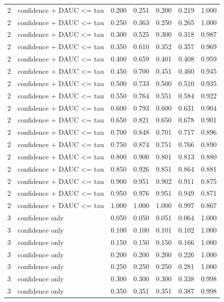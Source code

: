 \begin{tabular}{rlrrrrr}
2 & confidence + DAUC <= tau & 0.200 & 0.251 & 0.200 & 0.219 & 1.000 \\
2 & confidence + DAUC <= tau & 0.250 & 0.363 & 0.250 & 0.265 & 1.000 \\
2 & confidence + DAUC <= tau & 0.300 & 0.525 & 0.300 & 0.318 & 0.987 \\
2 & confidence + DAUC <= tau & 0.350 & 0.610 & 0.352 & 0.357 & 0.969 \\
2 & confidence + DAUC <= tau & 0.400 & 0.659 & 0.401 & 0.408 & 0.959 \\
2 & confidence + DAUC <= tau & 0.450 & 0.700 & 0.451 & 0.460 & 0.945 \\
2 & confidence + DAUC <= tau & 0.500 & 0.733 & 0.500 & 0.510 & 0.935 \\
2 & confidence + DAUC <= tau & 0.550 & 0.764 & 0.551 & 0.584 & 0.922 \\
2 & confidence + DAUC <= tau & 0.600 & 0.793 & 0.600 & 0.631 & 0.904 \\
2 & confidence + DAUC <= tau & 0.650 & 0.821 & 0.650 & 0.678 & 0.901 \\
2 & confidence + DAUC <= tau & 0.700 & 0.848 & 0.701 & 0.717 & 0.896 \\
2 & confidence + DAUC <= tau & 0.750 & 0.874 & 0.751 & 0.766 & 0.890 \\
2 & confidence + DAUC <= tau & 0.800 & 0.900 & 0.801 & 0.813 & 0.880 \\
2 & confidence + DAUC <= tau & 0.850 & 0.926 & 0.851 & 0.864 & 0.881 \\
2 & confidence + DAUC <= tau & 0.900 & 0.951 & 0.902 & 0.911 & 0.875 \\
2 & confidence + DAUC <= tau & 0.950 & 0.976 & 0.951 & 0.949 & 0.871 \\
2 & confidence + DAUC <= tau & 1.000 & 1.000 & 1.000 & 0.997 & 0.867 \\
3 & confidence only & 0.050 & 0.050 & 0.051 & 0.064 & 1.000 \\
3 & confidence only & 0.100 & 0.100 & 0.101 & 0.102 & 1.000 \\
3 & confidence only & 0.150 & 0.150 & 0.150 & 0.166 & 1.000 \\
3 & confidence only & 0.200 & 0.200 & 0.200 & 0.226 & 1.000 \\
3 & confidence only & 0.250 & 0.250 & 0.250 & 0.281 & 1.000 \\
3 & confidence only & 0.300 & 0.300 & 0.300 & 0.338 & 0.998 \\
3 & confidence only & 0.350 & 0.351 & 0.351 & 0.387 & 0.998 \\

\end{tabular}
